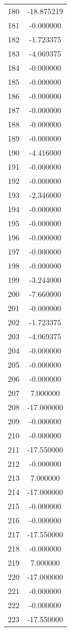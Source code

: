 \documentclass[12pt]{article}
\begin{document}
\begin{longtable}{@{}cc@{}}
180 & -18.875219 \\
181 & -0.000000 \\
182 & -1.723375 \\
183 & -4.069375 \\
184 & -0.000000 \\
185 & -0.000000 \\
186 & -0.000000 \\
187 & -0.000000 \\
188 & -0.000000 \\
189 & -0.000000 \\
190 & -4.416000 \\
191 & -0.000000 \\
192 & -0.000000 \\
193 & -2.346000 \\
194 & -0.000000 \\
195 & -0.000000 \\
196 & -0.000000 \\
197 & -0.000000 \\
198 & -0.000000 \\
199 & -3.244000 \\
200 & -7.660000 \\
201 & -0.000000 \\
202 & -1.723375 \\
203 & -4.069375 \\
204 & -0.000000 \\
205 & -0.000000 \\
206 & -0.000000 \\
207 & 7.000000 \\
208 & -17.000000 \\
209 & -0.000000 \\
210 & -0.000000 \\
211 & -17.550000 \\
212 & -0.000000 \\
213 & 7.000000 \\
214 & -17.000000 \\
215 & -0.000000 \\
216 & -0.000000 \\
217 & -17.550000 \\
218 & -0.000000 \\
219 & 7.000000 \\
220 & -17.000000 \\
221 & -0.000000 \\
222 & -0.000000 \\
223 & -17.550000 \\

\end{longtable}
\end{document}
